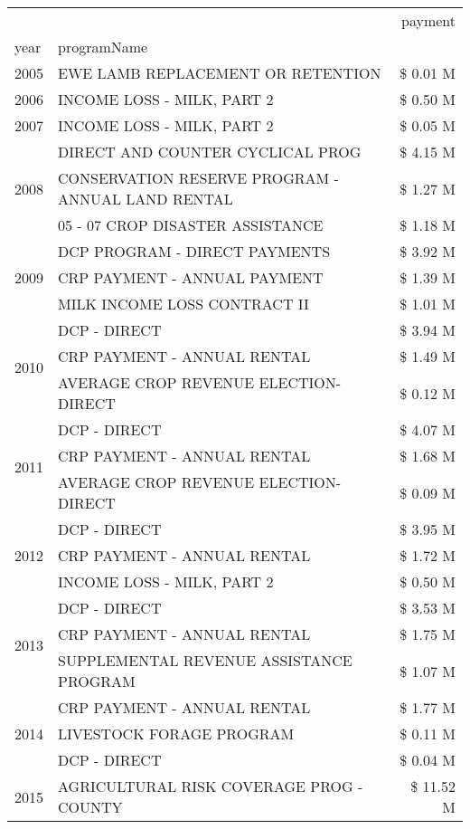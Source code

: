 \begin{tabular}{llr}
\toprule
 &  & payment \\
year & programName &  \\
\midrule
2005 & EWE LAMB REPLACEMENT OR RETENTION & \$ 0.01 M \\
\cline{1-3}
2006 & INCOME LOSS - MILK, PART 2 & \$ 0.50 M \\
\cline{1-3}
2007 & INCOME LOSS - MILK, PART 2 & \$ 0.05 M \\
\cline{1-3}
\multirow[t]{3}{*}{2008} & DIRECT AND COUNTER CYCLICAL PROG & \$ 4.15 M \\
 & CONSERVATION RESERVE PROGRAM - ANNUAL LAND RENTAL & \$ 1.27 M \\
 & 05 - 07 CROP DISASTER ASSISTANCE & \$ 1.18 M \\
\cline{1-3}
\multirow[t]{3}{*}{2009} & DCP PROGRAM - DIRECT PAYMENTS & \$ 3.92 M \\
 & CRP PAYMENT - ANNUAL PAYMENT & \$ 1.39 M \\
 & MILK INCOME LOSS CONTRACT II & \$ 1.01 M \\
\cline{1-3}
\multirow[t]{3}{*}{2010} & DCP - DIRECT & \$ 3.94 M \\
 & CRP PAYMENT - ANNUAL RENTAL & \$ 1.49 M \\
 & AVERAGE CROP REVENUE ELECTION-DIRECT & \$ 0.12 M \\
\cline{1-3}
\multirow[t]{3}{*}{2011} & DCP - DIRECT & \$ 4.07 M \\
 & CRP PAYMENT - ANNUAL RENTAL & \$ 1.68 M \\
 & AVERAGE CROP REVENUE ELECTION-DIRECT & \$ 0.09 M \\
\cline{1-3}
\multirow[t]{3}{*}{2012} & DCP - DIRECT & \$ 3.95 M \\
 & CRP PAYMENT - ANNUAL RENTAL & \$ 1.72 M \\
 & INCOME LOSS - MILK, PART 2 & \$ 0.50 M \\
\cline{1-3}
\multirow[t]{3}{*}{2013} & DCP - DIRECT & \$ 3.53 M \\
 & CRP PAYMENT - ANNUAL RENTAL & \$ 1.75 M \\
 & SUPPLEMENTAL REVENUE ASSISTANCE PROGRAM & \$ 1.07 M \\
\cline{1-3}
\multirow[t]{3}{*}{2014} & CRP PAYMENT - ANNUAL RENTAL & \$ 1.77 M \\
 & LIVESTOCK FORAGE PROGRAM & \$ 0.11 M \\
 & DCP - DIRECT & \$ 0.04 M \\
\cline{1-3}
\multirow[t]{3}{*}{2015} & AGRICULTURAL RISK COVERAGE PROG - COUNTY & \$ 11.52 M \\

\end{tabular}
